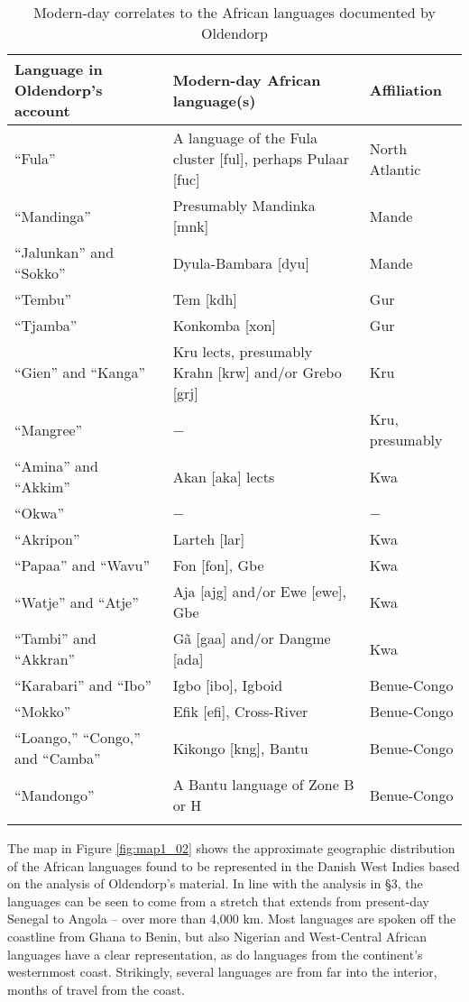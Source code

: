 \documentclass[output=paper,colorlinks,citecolor=brown]{langscibook}
\begin{document}
\begin{table}[t]
\begin{tabularx}{\textwidth}{lQl}
    \lsptoprule
    Language in Oldendorp’s account & Modern-day African language(s) & Affiliation \\ \midrule
    ``Fula'' & A language of the Fula cluster {[}ful{]}, perhaps Pulaar {[}fuc{]} & North Atlantic \\
    ``Mandinga'' & Presumably Mandinka {[}mnk{]} & Mande \\
    ``Jalunkan'' and “Sokko” & Dyula-Bambara {[}dyu{]} & Mande \\
    ``Tembu'' & Tem {[}kdh{]} & Gur \\
    ``Tjamba'' & Konkomba {[}xon{]} & Gur \\
    ``Gien'' and ``Kanga'' & Kru lects, presumably Krahn {[}krw{]} and/or Grebo {[}grj{]} & Kru \\
    ``Mangree'' & − & Kru, presumably \\
    ``Amina'' and ``Akkim'' & Akan {[}aka{]} lects & Kwa \\
    ``Okwa'' & − & − \\
    ``Akripon'' & Larteh {[}lar{]} & Kwa \\
    ``Papaa'' and ``Wavu'' & Fon {[}fon{]}, Gbe & Kwa \\
    ``Watje'' and ``Atje'' & Aja {[}ajg{]} and/or Ewe {[}ewe{]}, Gbe & Kwa \\
    ``Tambi'' and ``Akkran'' & G\~a {[}gaa{]} and/or Dangme {[}ada{]} & Kwa \\
    ``Karabari'' and ``Ibo'' & Igbo {[}ibo{]}, Igboid & Benue-Congo \\
    ``Mokko'' & Efik {[}efi{]}, Cross-River & Benue-Congo \\
    ``Loango,'' ``Congo,'' and ``Camba'' & Kikongo {[}kng{]}, Bantu & Benue-Congo \\
    ``Mandongo'' & A Bantu language of Zone B or H & Benue-Congo \\ \lspbottomrule
\end{tabularx}
\caption{Modern-day correlates to the African languages documented by Oldendorp}
\label{tab:tab5_02}
\end{table}

The map in Figure \ref{fig:map1_02} shows the approximate geographic distribution of the African languages found to be represented in the Danish West Indies based on the analysis of Oldendorp's material. In line with the analysis in §3, the languages can be seen to come from a stretch that extends from present-day Senegal to Angola – over more than 4,000 km. Most languages are spoken off the coastline from Ghana to Benin, but also Nigerian and West-Central African languages have a clear representation, as do languages from the continent’s westernmost coast. Strikingly, several languages are from far into the interior, months of travel from the coast.
\end{document}
